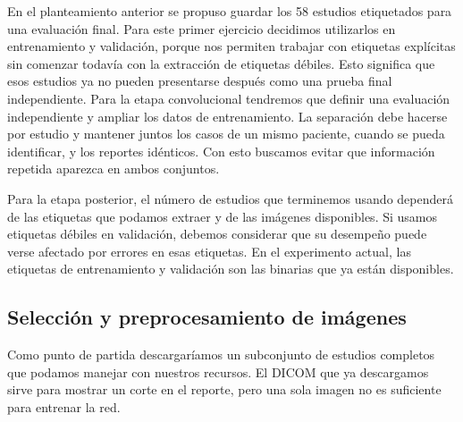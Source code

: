 \documentclass[eng]{ajceam-class}
\begin{document}
En el planteamiento anterior se propuso guardar los 58 estudios etiquetados para una evaluación final. Para este primer ejercicio decidimos utilizarlos en entrenamiento y validación, porque nos permiten trabajar con etiquetas explícitas sin comenzar todavía con la extracción de etiquetas débiles. Esto significa que esos estudios ya no pueden presentarse después como una prueba final independiente. Para la etapa convolucional tendremos que definir una evaluación independiente y ampliar los datos de entrenamiento. La separación debe hacerse por estudio y mantener juntos los casos de un mismo paciente, cuando se pueda identificar, y los reportes idénticos. Con esto buscamos evitar que información repetida aparezca en ambos conjuntos.

Para la etapa posterior, el número de estudios que terminemos usando dependerá de las etiquetas que podamos extraer y de las imágenes disponibles. Si usamos etiquetas débiles en validación, debemos considerar que su desempeño puede verse afectado por errores en esas etiquetas. En el experimento actual, las etiquetas de entrenamiento y validación son las binarias que ya están disponibles.

\subsection{Selección y preprocesamiento de imágenes}

Como punto de partida descargaríamos un subconjunto de estudios completos que podamos manejar con nuestros recursos. El DICOM que ya descargamos sirve para mostrar un corte en el reporte, pero una sola imagen no es suficiente para entrenar la red.
\end{document}
